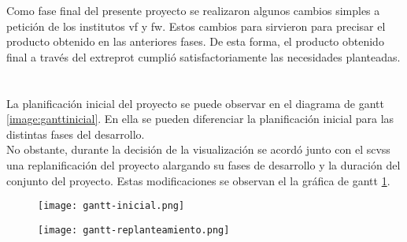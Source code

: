Como fase final del presente proyecto se realizaron algunos cambios simples a petición de los institutos \gls{vf} y \gls{fw}. Estos cambios para sirvieron  para precisar el producto obtenido en las anteriores fases. De esta forma, el producto obtenido final a través del \gls{extreprot} cumplió satisfactoriamente las  necesidades planteadas.

\section{} 
La planificación inicial del proyecto se puede observar en el diagrama de \gls{gantt} \ref{image:ganttinicial}. En ella se pueden diferenciar la planificación inicial para las distintas fases del desarrollo.\\

No obstante, durante la decisión de la visualización se acordó junto con el \gls{scvss} una replanificación del proyecto alargando su fases de desarrollo y la duración del conjunto del proyecto. Estas modificaciones se observan el la gráfica de \gls{gantt} \ref{image:ganttrepla}.

\begin{comment}
\todo[inline]{Estimación temporal y definición del calendario básico (hitos principales e iteraciones). Desarrollo de la planificación detallada, utilizando un diagrama de Gantt. Los diagramas de Gantt que se vean correctamente (girados y divididos si hace falta).}

En la imagen \ref{image:gantt} se muestra las fases del proyecto temporalmente ordenadas y las relaciones de dependencia entre ellas.
\end{comment}

\begin{figure}
\centering
\begin{minipage}{.5\textwidth}
  \centering
     \texttt{[image: gantt-inicial.png]}
  \label{image:ganttinicial}
\end{minipage}%
\begin{minipage}{.5\textwidth}
  \centering
     \texttt{[image: gantt-replanteamiento.png]}
  \label{image:ganttrepla}
\end{minipage}
\end{figure}


